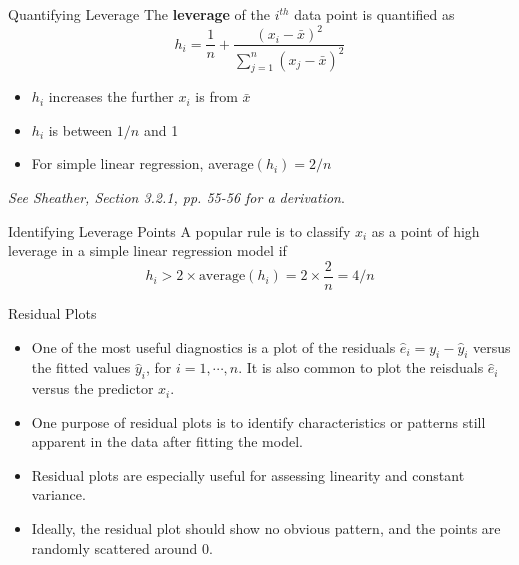 \documentclass[10pt]{beamer}
\begin{document}
\begin{frame}{Quantifying Leverage}
The \textbf{leverage} of the $i^{th}$ data point is quantified as
$$h_i = \frac{1}{n} + \frac{(x_i - \bar{x})^2}{\sum_{j=1}^n (x_j - \bar{x})^2}$$

\begin{itemize}
\item $h_i$ increases the further $x_i$ is from $\bar{x}$
\item $h_i$ is between $1/n$ and 1
\item For simple linear regression, average$(h_i) = 2/n$\\
\end{itemize}
\vspace{15pt}
\emph{See Sheather, Section 3.2.1, pp. 55-56 for a derivation}.
\end{frame}

\begin{frame}{Identifying Leverage Points}
A popular rule is to classify $x_i$ as a point of high leverage in a simple linear regression model if
$$h_i > 2 \times \text{average}(h_i) = 2 \times \frac{2}{n} = 4/n$$
\end{frame}


\begin{frame}{Residual Plots}
\begin{itemize}
\item One of the most useful diagnostics  is a plot of the residuals $\hat{e}_i = y_i - \hat{y}_i$ versus the fitted values $\hat{y}_i$, for $i=1, \cdots, n$.  It is also common to plot the reisduals $\hat{e}_i$ versus the predictor $x_i$.
\vspace{5pt}
\item One purpose of residual plots is to identify characteristics or patterns still apparent in the data after fitting the model.
\vspace{5pt}
\item Residual plots are especially useful for assessing linearity and constant variance.
\vspace{5pt}
\item Ideally, the residual plot should show no obvious pattern, and the points are randomly scattered around 0.
\end{itemize}
\end{frame}
\end{document}
